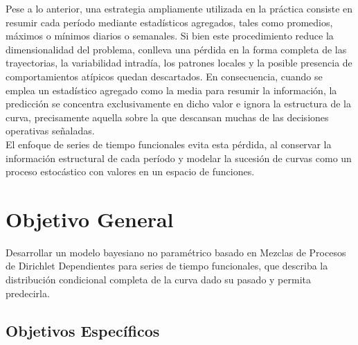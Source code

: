 Pese a lo anterior, una estrategia ampliamente utilizada en la práctica consiste en resumir cada período mediante estadísticos agregados, tales como promedios, máximos o mínimos diarios o semanales. Si bien este procedimiento reduce la dimensionalidad del problema, conlleva una pérdida en la forma completa de las trayectorias, la variabilidad intradía, los patrones locales y la posible presencia de comportamientos atípicos quedan descartados. En consecuencia, cuando se emplea un estadístico agregado como la media para resumir la información, la predicción se concentra exclusivamente en dicho valor e ignora la estructura de la curva, precisamente aquella sobre la que descansan muchas de las decisiones operativas señaladas.\\
 
El enfoque de series de tiempo funcionales evita esta pérdida, al conservar la información estructural de cada período y modelar la sucesión de curvas como un proceso estocástico con valores en un espacio de funciones.

\section{Objetivo General}
\label{01_03_00_objetivo_general}

Desarrollar un modelo bayesiano no paramétrico basado en Mezclas de Procesos de Dirichlet Dependientes para series de tiempo funcionales, que describa la distribución condicional completa de la curva dado su pasado y permita predecirla.

\subsection{Objetivos Específicos}
\label{01_03_01_objetivos_especificos}

